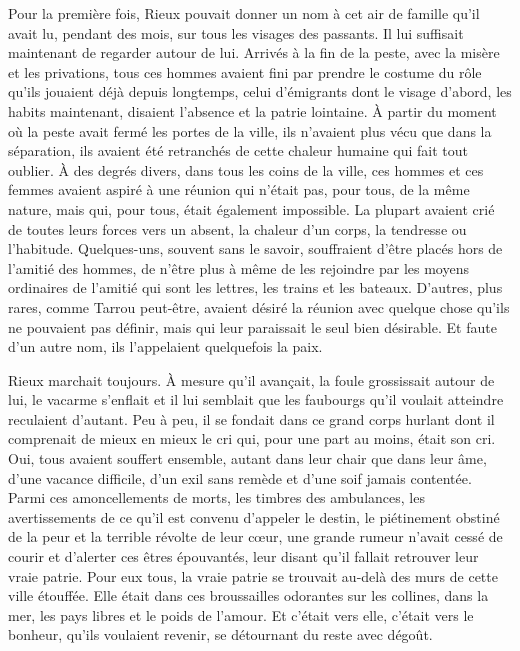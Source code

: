 \documentclass[french,twoside]{book} %
\begin{document}
Pour la première fois, Rieux pouvait donner un nom à cet air de famille qu’il avait lu, pendant des mois, sur tous les visages des passants. Il lui suffisait maintenant de regarder autour de lui. Arrivés à la fin de la peste, avec la misère et les privations, tous ces hommes avaient fini par prendre le costume du rôle qu’ils jouaient déjà depuis longtemps, celui d’émigrants dont le visage d’abord, les habits maintenant, disaient l’absence et la patrie lointaine. À partir du moment où la peste avait fermé les portes de la ville, ils n’avaient plus vécu que dans la séparation, ils avaient été retranchés de cette chaleur humaine qui fait tout oublier. À des degrés divers, dans tous les coins de la ville, ces hommes et ces femmes avaient aspiré à une réunion qui n’était pas, pour tous, de la même nature, mais qui, pour tous, était également impossible. La plupart avaient crié de toutes leurs forces vers un absent, la chaleur d’un corps, la tendresse ou l’habitude. Quelques-uns, souvent sans le savoir, souffraient d’être placés hors de l’amitié des hommes, de n’être plus à même de les rejoindre par les moyens ordinaires de l’amitié qui sont les lettres, les trains et les bateaux. D’autres, plus rares, comme Tarrou peut-être, avaient désiré la réunion avec quelque chose qu’ils ne pouvaient pas définir, mais qui leur paraissait le seul bien désirable. Et faute d’un autre nom, ils l’appelaient quelquefois la paix.\par
Rieux marchait toujours. À mesure qu’il avançait, la foule grossissait autour de lui, le vacarme s’enflait et il lui semblait que les faubourgs qu’il voulait atteindre reculaient d’autant. Peu à peu, il se fondait dans ce grand corps hurlant dont il comprenait de mieux en mieux le cri qui, pour une part au moins, était son cri. Oui, tous avaient souffert ensemble, autant dans leur chair que dans leur âme, d’une vacance difficile, d’un exil sans remède et d’une soif jamais contentée. Parmi ces amoncellements de morts, les timbres des ambulances, les avertissements de ce qu’il est convenu d’appeler le destin, le piétinement obstiné de la peur et la terrible révolte de leur cœur, une grande rumeur n’avait cessé de courir et d’alerter ces êtres épouvantés, leur disant qu’il fallait retrouver leur vraie patrie. Pour eux tous, la vraie patrie se trouvait au-delà des murs de cette ville étouffée. Elle était dans ces broussailles odorantes sur les collines, dans la mer, les pays libres et le poids de l’amour. Et c’était vers elle, c’était vers le bonheur, qu’ils voulaient revenir, se détournant du reste avec dégoût.\par
\end{document}
